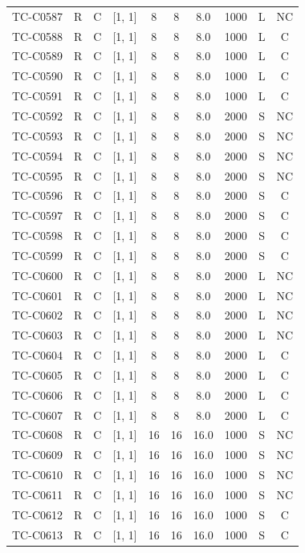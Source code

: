 \begin{longtable}{lccccccccc}
TC-C0587 & R & C & [1, 1] & 8 & 8 & 8.0 & 1000 & L & NC \\
TC-C0588 & R & C & [1, 1] & 8 & 8 & 8.0 & 1000 & L & C \\
TC-C0589 & R & C & [1, 1] & 8 & 8 & 8.0 & 1000 & L & C \\
TC-C0590 & R & C & [1, 1] & 8 & 8 & 8.0 & 1000 & L & C \\
TC-C0591 & R & C & [1, 1] & 8 & 8 & 8.0 & 1000 & L & C \\
TC-C0592 & R & C & [1, 1] & 8 & 8 & 8.0 & 2000 & S & NC \\
TC-C0593 & R & C & [1, 1] & 8 & 8 & 8.0 & 2000 & S & NC \\
TC-C0594 & R & C & [1, 1] & 8 & 8 & 8.0 & 2000 & S & NC \\
TC-C0595 & R & C & [1, 1] & 8 & 8 & 8.0 & 2000 & S & NC \\
TC-C0596 & R & C & [1, 1] & 8 & 8 & 8.0 & 2000 & S & C \\
TC-C0597 & R & C & [1, 1] & 8 & 8 & 8.0 & 2000 & S & C \\
TC-C0598 & R & C & [1, 1] & 8 & 8 & 8.0 & 2000 & S & C \\
TC-C0599 & R & C & [1, 1] & 8 & 8 & 8.0 & 2000 & S & C \\
TC-C0600 & R & C & [1, 1] & 8 & 8 & 8.0 & 2000 & L & NC \\
TC-C0601 & R & C & [1, 1] & 8 & 8 & 8.0 & 2000 & L & NC \\
TC-C0602 & R & C & [1, 1] & 8 & 8 & 8.0 & 2000 & L & NC \\
TC-C0603 & R & C & [1, 1] & 8 & 8 & 8.0 & 2000 & L & NC \\
TC-C0604 & R & C & [1, 1] & 8 & 8 & 8.0 & 2000 & L & C \\
TC-C0605 & R & C & [1, 1] & 8 & 8 & 8.0 & 2000 & L & C \\
TC-C0606 & R & C & [1, 1] & 8 & 8 & 8.0 & 2000 & L & C \\
TC-C0607 & R & C & [1, 1] & 8 & 8 & 8.0 & 2000 & L & C \\
TC-C0608 & R & C & [1, 1] & 16 & 16 & 16.0 & 1000 & S & NC \\
TC-C0609 & R & C & [1, 1] & 16 & 16 & 16.0 & 1000 & S & NC \\
TC-C0610 & R & C & [1, 1] & 16 & 16 & 16.0 & 1000 & S & NC \\
TC-C0611 & R & C & [1, 1] & 16 & 16 & 16.0 & 1000 & S & NC \\
TC-C0612 & R & C & [1, 1] & 16 & 16 & 16.0 & 1000 & S & C \\
TC-C0613 & R & C & [1, 1] & 16 & 16 & 16.0 & 1000 & S & C \\

\end{longtable}
